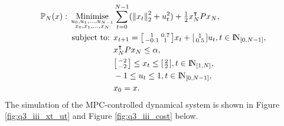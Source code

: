 \documentclass[a4paper,11pt,reqno]{amsart}
\newcommand{\N}{{\rm I\!N}}
\newcommand{\tran}{\intercal}
\begin{document}
\begin{subequations}
    \begin{align}
        \mathbb{P}_N(x){}:{}
        \operatorname*{Minimise}_{\substack{u_0,u_1,\ldots,u_{N-1}\\ x_0,x_1,\ldots,x_N}}&\sum_{t=0}^{N-1} (\left\lVert x_t\right\rVert ^2_2+u_t^2) + \tfrac{1}{2}x_N^{\tran}P x_N,
        \\
        \text{subject to: }& x_{t+1} = 
        \begin{bsmallmatrix}
            1&0.7\\
            -0.1&1
        \end{bsmallmatrix}x_t + 
        \begin{bsmallmatrix}
            1\\
            0.5
        \end{bsmallmatrix}u_t, t\in\N_{[0,N-1]},
        \\
        &x_N^{\tran} P x_N \leq \alpha,
        \\
        &\begin{bsmallmatrix}
            -2\\
            -2
        \end{bsmallmatrix} 
        \leq x_t \leq 
        \begin{bsmallmatrix}
            2\\
            2
        \end{bsmallmatrix}, t\in\N_{[1,N]},
        \\
        &-1 \leq u_t \leq 1, t\in\N_{[0,N-1]},
        \\
        & x_0 = x.
    \end{align}
\end{subequations}
The simulation of the MPC-controlled dynamical system is shown in Figure \ref{fig:q3_iii_xt_ut} and Figure \ref{fig:q3_iii_cost} below.
\end{document}

